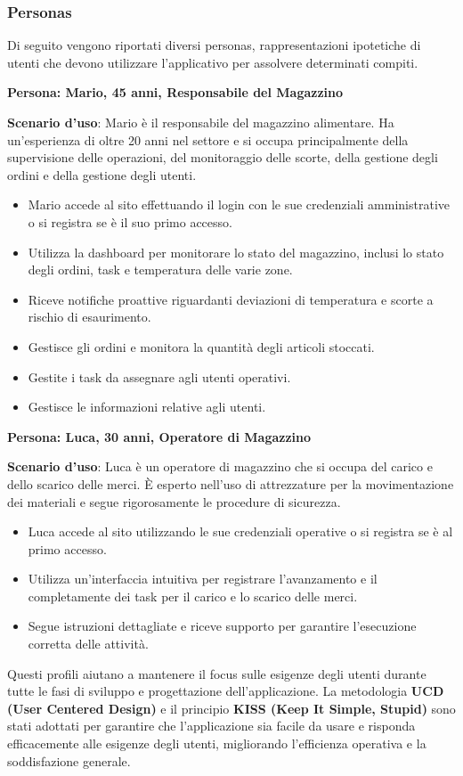 \subsubsection{Personas}

Di seguito vengono riportati diversi personas, rappresentazioni ipotetiche di utenti che devono utilizzare l’applicativo per assolvere determinati compiti.

\textbf{Persona: Mario, 45 anni, Responsabile del Magazzino}

\textbf{Scenario d’uso}: Mario è il responsabile del magazzino alimentare. Ha un'esperienza di oltre 20 anni nel settore e si occupa principalmente della supervisione delle operazioni, del monitoraggio delle scorte, della gestione degli ordini e della gestione degli utenti.

\begin{itemize}
    \item Mario accede al sito effettuando il login con le sue credenziali amministrative o si registra se è il suo primo accesso.
    \item Utilizza la dashboard per monitorare lo stato del magazzino, inclusi lo stato degli ordini, task e temperatura delle varie zone.
    \item Riceve notifiche proattive riguardanti deviazioni di temperatura e scorte a rischio di esaurimento.
    \item Gestisce gli ordini e monitora la quantità degli articoli stoccati.
    \item Gestite i task da assegnare agli utenti operativi.
    \item Gestisce le informazioni relative agli utenti.
\end{itemize}

\textbf{Persona: Luca, 30 anni, Operatore di Magazzino}

\textbf{Scenario d’uso}: Luca è un operatore di magazzino che si occupa del carico e dello scarico delle merci. È esperto nell'uso di attrezzature per la movimentazione dei materiali e segue rigorosamente le procedure di sicurezza.

\begin{itemize}
    \item Luca accede al sito utilizzando le sue credenziali operative o si registra se è al primo accesso.
    \item Utilizza un’interfaccia intuitiva per registrare l'avanzamento e il completamente dei task per il carico e lo scarico delle merci.
    \item Segue istruzioni dettagliate e riceve supporto per garantire l’esecuzione corretta delle attività.
\end{itemize}

Questi profili aiutano a mantenere il focus sulle esigenze degli utenti durante tutte le fasi di sviluppo e progettazione dell'applicazione. La metodologia \textbf{UCD (User Centered Design)} e il principio \textbf{KISS (Keep It Simple, Stupid)} sono stati adottati per garantire che l'applicazione sia facile da usare e risponda efficacemente alle esigenze degli utenti, migliorando l'efficienza operativa e la soddisfazione generale.



